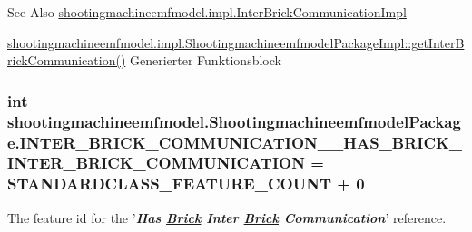 \begin{DoxySeeAlso}{See Also}
\hyperlink{classshootingmachineemfmodel_1_1impl_1_1_inter_brick_communication_impl}{shootingmachineemfmodel.\-impl.\-Inter\-Brick\-Communication\-Impl} 

\hyperlink{classshootingmachineemfmodel_1_1impl_1_1_shootingmachineemfmodel_package_impl_a6dcf03b9cd465e27248a0278c6e55f11}{shootingmachineemfmodel.\-impl.\-Shootingmachineemfmodel\-Package\-Impl\-::get\-Inter\-Brick\-Communication()} Generierter Funktionsblock 
\end{DoxySeeAlso}
\hypertarget{interfaceshootingmachineemfmodel_1_1_shootingmachineemfmodel_package_a4c6fd564dd4ba2568a585c6dc93b72fc}{
\subsubsection[{I\-N\-T\-E\-R\-\_\-\-B\-R\-I\-C\-K\-\_\-\-C\-O\-M\-M\-U\-N\-I\-C\-A\-T\-I\-O\-N\-\_\-\-\_\-\-H\-A\-S\-\_\-\-B\-R\-I\-C\-K\-\_\-\-I\-N\-T\-E\-R\-\_\-\-B\-R\-I\-C\-K\-\_\-\-C\-O\-M\-M\-U\-N\-I\-C\-A\-T\-I\-O\-N}]{\setlength{\rightskip}{0pt plus 5cm}int shootingmachineemfmodel.\-Shootingmachineemfmodel\-Package.\-I\-N\-T\-E\-R\-\_\-\-B\-R\-I\-C\-K\-\_\-\-C\-O\-M\-M\-U\-N\-I\-C\-A\-T\-I\-O\-N\-\_\-\-\_\-\-H\-A\-S\-\_\-\-B\-R\-I\-C\-K\-\_\-\-I\-N\-T\-E\-R\-\_\-\-B\-R\-I\-C\-K\-\_\-\-C\-O\-M\-M\-U\-N\-I\-C\-A\-T\-I\-O\-N = {\bf S\-T\-A\-N\-D\-A\-R\-D\-C\-L\-A\-S\-S\-\_\-\-F\-E\-A\-T\-U\-R\-E\-\_\-\-C\-O\-U\-N\-T} + 0}}\label{interfaceshootingmachineemfmodel_1_1_shootingmachineemfmodel_package_a4c6fd564dd4ba2568a585c6dc93b72fc}
The feature id for the '{\itshape {\bfseries Has \hyperlink{interfaceshootingmachineemfmodel_1_1_brick}{Brick} Inter \hyperlink{interfaceshootingmachineemfmodel_1_1_brick}{Brick} Communication}}' reference.

